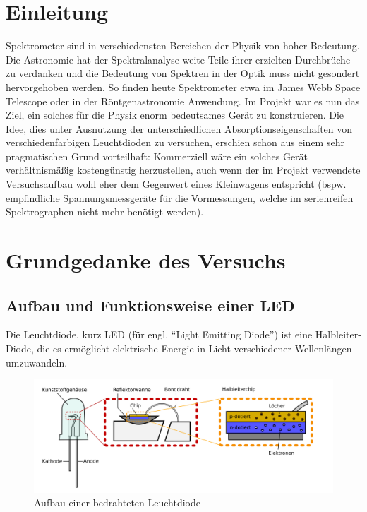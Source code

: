 \documentclass[11pt]{scrartcl}
\begin{document}
\section{Einleitung} %
Spektrometer sind in verschiedensten Bereichen der Physik von hoher Bedeutung. Die Astronomie hat der Spektralanalyse weite Teile ihrer erzielten Durchbrüche zu verdanken und die Bedeutung von Spektren in der Optik muss nicht gesondert hervorgehoben werden. So finden heute  Spektrometer etwa im James Webb Space Telescope oder in der Röntgenastronomie Anwendung. Im Projekt war es nun das Ziel, ein solches für die Physik enorm bedeutsames Gerät zu konstruieren. Die Idee, dies unter Ausnutzung der unterschiedlichen Absorptionseigenschaften von verschiedenfarbigen Leuchtdioden zu versuchen, erschien schon aus einem sehr pragmatischen Grund vorteilhaft: Kommerziell wäre ein solches Gerät verhältnismäßig kostengünstig herzustellen, auch wenn der im Projekt verwendete Versuchsaufbau wohl eher dem Gegenwert eines Kleinwagens entspricht (bspw. empfindliche Spannungsmessgeräte für die Vormessungen, welche im serienreifen Spektrographen nicht mehr benötigt werden).



\section{Grundgedanke des Versuchs}


\subsection{Aufbau und Funktionsweise einer LED}
Die Leuchtdiode, kurz LED (für engl. "`Light Emitting Diode"') ist eine Halbleiter-Diode, die es ermöglicht elektrische Energie in Licht verschiedener Wellenlängen umzuwandeln.

\begin{figure}[ht]
\begin{center}
\includegraphics[width=1.0\textwidth]{ledaufbau.png}
\end{center}
\vspace{-1.5\baselineskip}
\caption{Aufbau einer bedrahteten Leuchtdiode}
\label{LED-Aufbau}
\end{figure}
\end{document}
